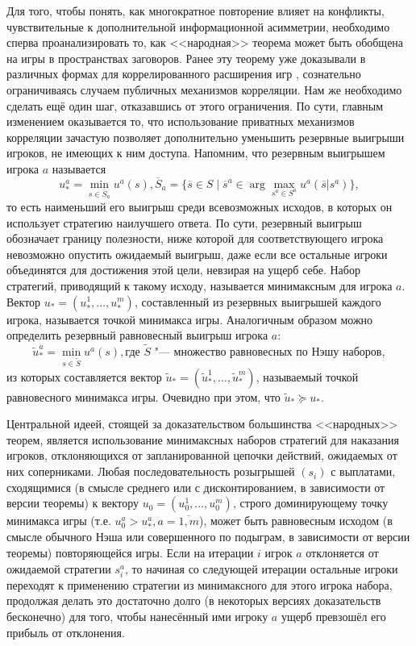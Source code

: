 Для того, чтобы понять, как многократное повторение влияет на конфликты, чувствительные к дополнительной информационной асимметрии, необходимо сперва проанализировать то, как <<народная>> теорема может быть обобщена на игры в пространствах заговоров. Ранее эту теорему уже доказывали в различных формах для коррелированного расширения игр \cite{Fudenberg}, сознательно ограничиваясь случаем публичных механизмов корреляции. Нам же необходимо сделать ещё один шаг, отказавшись от этого ограничения. По сути, главным изменением оказывается то, что использование приватных механизмов корреляции зачастую позволяет дополнительно уменьшить резервные выигрыши игроков, не имеющих к ним доступа. Напомним, что резервным выигрышем игрока $a$ называется
\begin{equation*}
	u^a_* = \min_{s \in \overline{S}_a} u^a(s), \overline{S}_a = \{\overline{s} \in S \mid \overline{s}^a \in \arg\max_{s^a \in S^a} u^a(\overline{s} | s^a)\},
\end{equation*}
то есть наименьший его выигрыш среди всевозможных исходов, в которых он использует стратегию наилучшего ответа. По сути, резервный выигрыш обозначает границу полезности, ниже которой для соответствующего игрока невозможно опустить ожидаемый выигрыш, даже если все остальные игроки объединятся для достижения этой цели, невзирая на ущерб себе. Набор стратегий, приводящий к такому исходу, называется минимаксным для игрока $a$. Вектор $u_* = (u^1_*, \ldots, u^m_*)$, составленный из резервных выигрышей каждого игрока, называется точкой минимакса игры. Аналогичным образом можно определить резервный равновесный выигрыш игрока $a$:
\begin{equation*}
	\tilde{u}^a_* = \min_{s \in \tilde{S}} u^a(s), \text{где $\tilde{S}$ "--- множество равновесных по Нэшу наборов},
\end{equation*}
из которых составляется вектор $\tilde{u}_* = (\tilde{u}^1_*, \ldots, \tilde{u}^m_*)$, называемый точкой равновесного минимакса игры. Очевидно при этом, что $\tilde{u}_* \succeq u_*$.

Центральной идеей, стоящей за доказательством большинства <<народных>> теорем, является использование минимаксных наборов стратегий для наказания игроков, отклоняющихся от запланированной цепочки действий, ожидаемых от них соперниками. Любая последовательность розыгрышей $(s_i)$ с выплатами, сходящимися (в смысле среднего или с дисконтированием, в зависимости от версии теоремы) к вектору $u_0 = (u^1_0, \ldots, u^m_0)$, строго доминирующему точку минимакса игры (т.е. $u^a_0 > u^a_*, a = \overline{1,m}$), может быть равновесным исходом (в смысле обычного Нэша или совершенного по подыграм, в зависимости от версии теоремы) повторяющейся игры. Если на итерации $i$ игрок $a$ отклоняется от ожидаемой стратегии $s^a_i$, то начиная со следующей итерации остальные игроки переходят к применению стратегии из минимаксного для этого игрока набора, продолжая делать это достаточно долго (в некоторых версиях доказательств бесконечно) для того, чтобы нанесённый ими игроку $a$ ущерб превзошёл его прибыль от отклонения.

